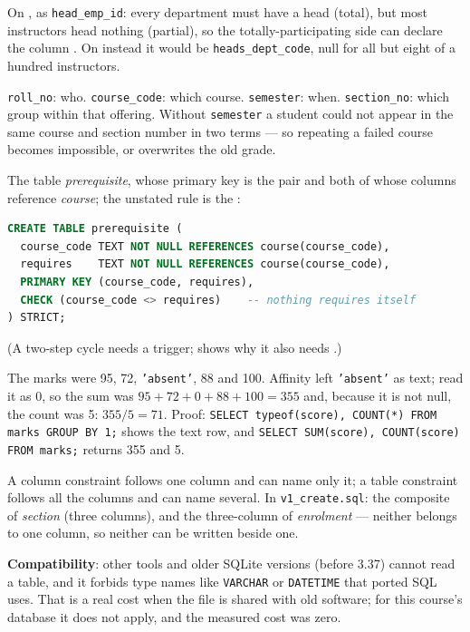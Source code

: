 \begin{ans}
  \item On , as \texttt{head\_emp\_id}: every department must
        have a head (total), but most instructors head nothing (partial), so
        the totally-participating side can declare the column .
        On  instead it would be \texttt{heads\_dept\_code},
        null for all but eight of a hundred instructors.
  \item \texttt{roll\_no}: who. \texttt{course\_code}: which course.
        \texttt{semester}: when. \texttt{section\_no}: which group within that
        offering. Without \texttt{semester} a student could not appear in the
        same course and section number in two terms --- so repeating a failed
        course becomes impossible, or overwrites the old grade.
  \item The table \textit{prerequisite}, whose primary key is the pair and
        both of whose columns reference \textit{course}; the unstated rule is
        the :
\begin{lstlisting}[language=sql]
CREATE TABLE prerequisite (
  course_code TEXT NOT NULL REFERENCES course(course_code),
  requires    TEXT NOT NULL REFERENCES course(course_code),
  PRIMARY KEY (course_code, requires),
  CHECK (course_code <> requires)    -- nothing requires itself
) STRICT;
\end{lstlisting}
 (A two-step cycle needs a trigger;
         shows why it also needs .)
\end{ans}

\begin{ans}
  \item The marks were 95, 72, \texttt{'absent'}, 88 and 100. Affinity left
        \texttt{'absent'} as text;  read it as 0, so the sum was
        $95 + 72 + 0 + 88 + 100 = 355$ and, because it is not null, the count
        was 5: $355 / 5 = 71$. Proof: \texttt{SELECT typeof(score), COUNT(*)
        FROM marks GROUP BY 1;} shows the text row, and \texttt{SELECT
        SUM(score), COUNT(score) FROM marks;} returns 355 and 5.
  \item A column constraint follows one column and can name only it; a table
        constraint follows all the columns and can name several. In
        \texttt{v1\_create.sql}: the composite  of
        \textit{section} (three columns), and the three-column
         of \textit{enrolment} --- neither belongs to one
        column, so neither can be written beside one.
  \item \textbf{Compatibility}: other tools and older SQLite versions (before
        3.37) cannot read a  table, and it forbids type names
        like \texttt{VARCHAR} or \texttt{DATETIME} that ported SQL uses. That
        is a real cost when the file is shared with old software; for this
        course's database it does not apply, and the measured cost was zero.
\end{ans}


